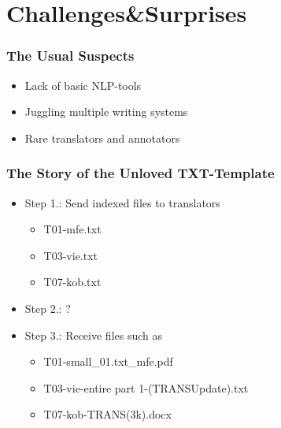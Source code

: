 \documentclass[aspectratio=169]{beamer}
\begin{document}
\section{Challenges\&Surprises}

\begin{frame}[fragile]
	\frametitle{The Usual Suspects}
    \begin{itemize}
        \item Lack of basic NLP-tools
        \item Juggling multiple writing systems
        \item Rare translators and annotators
    \end{itemize}
\end{frame}

\begin{frame}[fragile]
	\frametitle{The Story of the Unloved TXT-Template}
    \centering
    \large
    \begin{itemize}
        \item Step 1.: Send indexed files to translators
        \begin{itemize}
            \item T01-mfe.txt
            \item T03-vie.txt
            \item T07-kob.txt
        \end{itemize}
        \item Step 2.: ?
        \item Step 3.: Receive files such as
        \begin{itemize}
            \item T01-small\_01.txt\_mfe.pdf
            \item T03-vie-entire part 1-(TRANSUpdate).txt
            \item T07-kob-TRANS(3k).docx
        \end{itemize}
    \end{itemize}
\end{frame}
\end{document}
